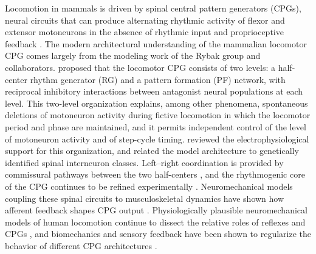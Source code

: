 Locomotion in mammals is driven by spinal central pattern generators (CPGs), neural circuits that can produce alternating rhythmic activity of flexor and extensor motoneurons in the absence of rhythmic input and proprioceptive feedback \citep{brown_intrinsic_1911, rybak_modelling_2006}. The modern architectural understanding of the mammalian locomotor CPG comes largely from the modeling work of the Rybak group and collaborators. \citet{rybak_modelling_2006} proposed that the locomotor CPG consists of two levels: a half-center rhythm generator (RG) and a pattern formation (PF) network, with reciprocal inhibitory interactions between antagonist neural populations at each level. This two-level organization explains, among other phenomena, spontaneous deletions of motoneuron activity during fictive locomotion in which the locomotor period and phase are maintained, and it permits independent control of the level of motoneuron activity and of step-cycle timing. \citet{mccrea_organization_2008} reviewed the electrophysiological support for this organization, and \citet{rybak_organization_2015} related the model architecture to genetically identified spinal interneuron classes. Left--right coordination is provided by commissural pathways between the two half-centers \citep{molkov_mechanisms_2015, danner_central_2016}, and the rhythmogenic core of the CPG continues to be refined experimentally \citep{rancic_recent_2021}. Neuromechanical models coupling these spinal circuits to musculoskeletal dynamics have shown how afferent feedback shapes CPG output \citep{markin_afferent_2010, shevtsova_modeling_2016}. Physiologically plausible neuromechanical models of human locomotion continue to dissect the relative roles of reflexes and CPGs \citep{dirusso_investigating_2023}, and biomechanics and sensory feedback have been shown to regularize the behavior of different CPG architectures \citep{deng_biomechanical_2022}.

